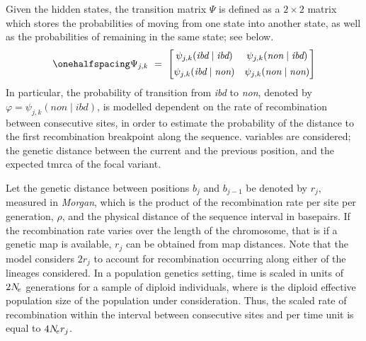 Given the  hidden states, the transition matrix $\Psi$ is defined as a $2 \times 2$ matrix which stores the probabilities of moving from one state into another state, as well as the probabilities of remaining in the same state; see below.
\begin{equation}\label{eq:transmatrix}\onehalfspacing
\Psi_{j,k}  ~=~
\begin{bmatrix}
	\psi_{j,k}(\textit{ibd}\mid\textit{ibd})  &
	\psi_{j,k}(\textit{non}\mid\textit{ibd})  \\[1ex]
	\psi_{j,k}(\textit{ibd}\mid\textit{non})  &
	\psi_{j,k}(\textit{non}\mid\textit{non})  \\
\end{bmatrix}
\end{equation}
In particular, the probability of transition from \emph{ibd} to \emph{non}, denoted by ${\varphi = \psi_{j,k}(\textit{non}\mid\textit{ibd})}$, is modelled dependent on the rate of recombination between consecutive sites, in order to estimate the probability of the distance to the first recombination breakpoint along the sequence.
 variables are considered; the genetic distance between the current and the previous position, and the expected \gls{tmrca} of the focal \fk{} variant.

Let the genetic distance between positions $b_j$ and $b_{j-1}$ be denoted by $r_j$, measured in \emph{Morgan}, which is the product of the recombination rate per site per generation, $\rho$, and the physical distance of the sequence interval in basepairs.
If the recombination rate varies over the length of the chromosome, that is if a genetic map is available, $r_j$ can be obtained from map distances.
Note that the model considers ${2 r_j}$ to account for recombination occurring along either of the  lineages considered.
In a population genetics setting, time is scaled in units of $2N_{\!e}$ generations for a sample of diploid individuals, where \Ne is the diploid effective population size of the population under consideration.
Thus, the scaled rate of recombination within the interval between consecutive sites and per time unit is equal to ${4N_{\!e} r_j}$.

